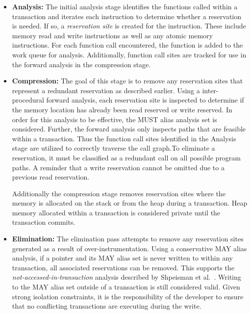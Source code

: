 \documentclass[preprint]{sigplanconf}
\begin{document}
\begin{itemize}

\item {\bf Analysis:} The initial analysis stage identifies the functions called within a transaction and iterates each instruction to determine whether a reservation is needed. If so, a \emph{reservation site} is created for the instruction. These include memory read and write instructions as well as any atomic memory instructions. For each function call encountered, the function is added to the work queue for analysis. Additionally, function call sites are tracked for use in the forward analysis in the compression stage.

\item {\bf Compression:} The goal of this stage is to remove any reservation sites that represent a redundant reservation as described earlier. Using a inter-procedural forward analysis, each reservation site is inspected to determine if the memory location has already been read reserved or write reserved. In order for this analysis to be effective, the MUST alias analysis set is considered. Further, the forward analysis only inspects paths that are feasible within a transaction. Thus the function call sites identified in the Analysis stage are utilized to correctly traverse the call graph.To eliminate a reservation, it must be classified as a redundant call on all possible program paths. A reminder that a write reservation cannot be omitted due to a previous read reservation.

Additionally the compression stage removes reservation sites where the memory is allocated on the stack or from the heap during a transaction. Heap memory allocated within a transaction is considered private until the transaction commits.

\item {\bf Elimination:} The elimination pass attempts to remove any reservation sites generated as a result of over-instrumentation. Using a conservative MAY alias analysis, if a pointer and its MAY alias set is never written to within any transaction, all associated reservations can be removed. This supports the \emph{not-accessed-in-transaction} analysis described by Shpeisman et al.~\cite{Shpeisman:2007:EIO:1250734.1250744}. Writing to the MAY alias set outside of a transaction is still considered valid. Given strong isolation constraints, it is the responsibility of the developer to ensure that no conflicting transactions are executing during the write.


\end{itemize}
\end{document}
